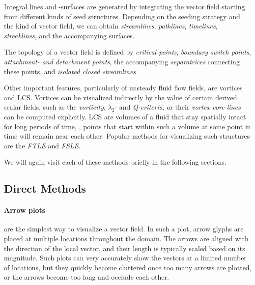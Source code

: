 %
Integral lines and -surfaces are generated by integrating the vector field
starting from different kinds of seed structures.
%
Depending on the seeding strategy and the kind of vector field, we can obtain
\emph{streamlines}, \emph{pathlines}, \emph{timelines}, \emph{streaklines},
and the accompanying surfaces.
%

%
The topology of a vector field is defined by \emph{critical points},
\emph{boundary switch points}, \emph{attachment- and detachment points}, the
accompanying \emph{separatrices} connecting these points, and \emph{isolated
closed streamlines}
%

%
Other important features, particularly of unsteady fluid flow fields, are
vortices and \ac{LCS}.
%
Vortices can be visualized indirectly by the value of certain derived scalar
fields, such as the \emph{vorticity}, \emph{$\lambda_2$}- and
\emph{Q-criteria}, or their \emph{vortex core lines} can be computed explicitly.
%
\ac{LCS} are volumes of a fluid that stay spatially intact for long periods of
time, \eg, points that start within such a volume at some point in time will
remain near each other.
%
Popular methods for visualizing such structures are the \emph{\ac{FTLE}} and
\emph{\ac{FSLE}}.
%

%
We will again visit each of these methods briefly in the following sections.
%

%
\subsection{Direct Methods} %
\label{sub:direct_methods}
%
\paragraph{Arrow plots} are the simplest way to visualize a vector field.
%
In such a plot, arrow glyphs are placed at multiple locations throughout the
domain.
%
The arrows are aligned with the direction of the local vector, and their
length is typically scaled based on its magnitude.
%
Such plots can very accurately show the vectors at a limited number of
locations, but they quickly become cluttered once too many arrows are plotted,
or the arrows become too long and occlude each other.
%

%
